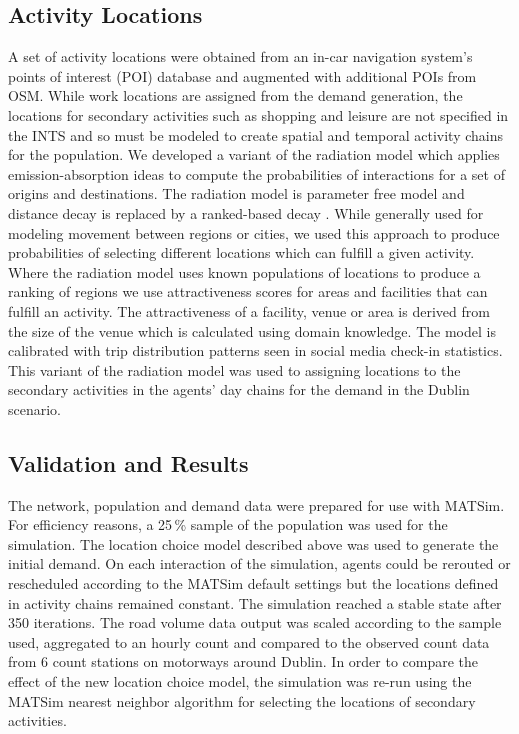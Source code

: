 \subsection{Activity Locations}
A set of activity locations were obtained from an in-car navigation system’s points of interest (POI) database and augmented with additional POIs from OSM. While work locations are assigned from the demand generation, the locations for secondary activities such as shopping and leisure are not specified in the INTS and so must be modeled to create spatial and temporal activity chains for the population. We developed a variant of the radiation model which applies emission-absorption ideas to compute the probabilities of interactions for a set of origins and destinations. The radiation model is parameter free model and distance decay is replaced by a ranked-based decay \citep[][]{SiminiEtAl_NAT_2012}. While generally used for modeling movement between regions or cities, we used this approach to produce probabilities of selecting different locations which can fulfill a given activity. Where the radiation model uses known populations of locations to produce a ranking of regions we use attractiveness scores for areas and facilities that can fulfill an activity. The attractiveness of a facility, venue or area is derived from the size of the venue which is calculated using domain knowledge. The model is calibrated with trip distribution patterns seen in social media check-in statistics. This variant of the radiation model was used to assigning locations to the secondary activities in the agents’ day chains for the demand in the Dublin scenario.

\subsection{Validation and Results}
The network, population and demand data were prepared for use with MATSim. For efficiency reasons, a 25\,\% sample of the population was used for the simulation. The location choice model described above was used to generate the initial demand. On each interaction of the simulation, agents could be rerouted or rescheduled according to the MATSim default settings but the locations defined in activity chains remained constant. The simulation reached a stable state after 350 iterations. The road volume data output was scaled according to the sample used, aggregated to an hourly count and compared to the observed count data from 6 count stations on motorways around Dublin. In order to compare the effect of the new location choice model, the simulation was re-run using the MATSim nearest neighbor algorithm for selecting the locations of secondary activities.

